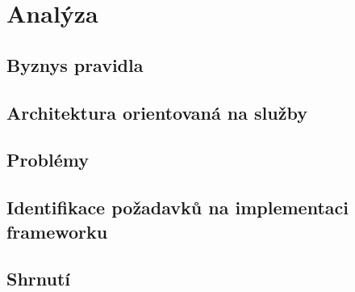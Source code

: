
\chapter{Anal\'yza}\label{ch:analyza}

\section{Byznys pravidla}

\section{Architektura orientovaná na služby}

\section{Problémy}

\section{Identifikace požadavků na implementaci frameworku}

\section{Shrnutí}
